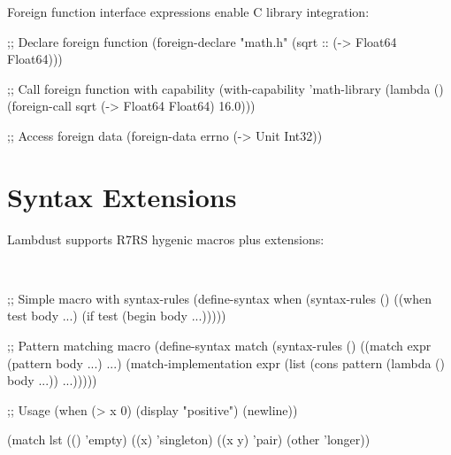 
Foreign function interface expressions enable C library integration:

\begin{grammar}
\end{grammar}

\begin{example}
\begin{lambdustcode}
;; Declare foreign function  
(foreign-declare "math.h"
  (sqrt :: (-> Float64 Float64)))

;; Call foreign function with capability
(with-capability 'math-library
  (lambda ()
    (foreign-call sqrt (-> Float64 Float64) 16.0)))

;; Access foreign data
(foreign-data errno (-> Unit Int32))
\end{lambdustcode}
\end{example}

\section{Syntax Extensions}
\label{sec:syntax-extensions}


Lambdust supports R7RS hygenic macros plus extensions:

\begin{grammar}
\\
\end{grammar}

\begin{example}
\begin{lambdustcode}
;; Simple macro with syntax-rules
(define-syntax when
  (syntax-rules ()
    ((when test body ...)
     (if test (begin body ...)))))

;; Pattern matching macro
(define-syntax match
  (syntax-rules ()
    ((match expr 
       (pattern body ...) ...)
     (match-implementation expr 
       (list (cons pattern (lambda () body ...)) ...)))))

;; Usage
(when (> x 0) 
  (display "positive")
  (newline))

(match lst
  (() 'empty)
  ((x) 'singleton)
  ((x y) 'pair)  
  (other 'longer))
\end{lambdustcode}
\end{example}

